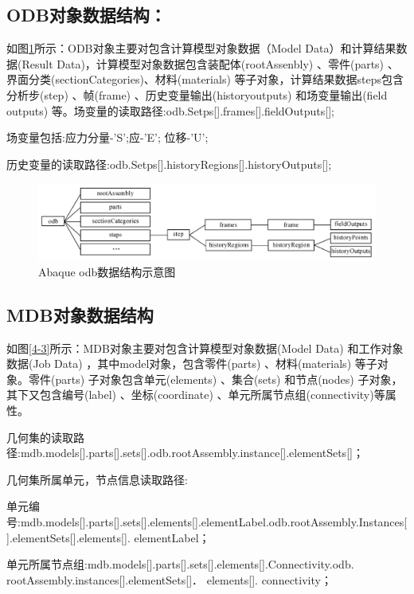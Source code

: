 \documentclass[forprint]{WHUBachelor}
\begin{document}
\subsection{ODB对象数据结构：}

如图\ref{4-2}所示：ODB对象主要对包含计算模型对象数据（Model Data）和计算结果数据(Result Data)，计算模型对象数据包含装配体(rootAssenbly)
、零件(parts) 、界面分类(sectionCategories)、材料(materials) 等子对象，计算结果数据steps包含分析步(step)
、帧(frame) 、历史变量输出(historyoutputs) 和场变量输出(field outputs) 等。场变量的读取路径:odb.Setps{[}{]}.frames{[}{]}.fieldOutputs{[}{]};

场变量包括:应力分量-'S';应-'E'; 位移-'U';

历史变量的读取路径:odb.Setps{[}{]}.historyRegions{[}{]}.historyOutputs{[}{]};

\begin{figure}[H]
\centering  
\includegraphics[width = .8\textwidth]{2.png} 
\caption{Abaque odb数据结构示意图} 
\label{4-2} 
\end{figure}

\subsection{MDB对象数据结构}

如图\ref{4-3}所示：MDB对象主要对包含计算模型对象数据(Model Data) 和工作对象数据(Job Data) ，其中model对象，包含零件(parts)
、材料(materials) 等子对象。零件(parts) 子对象包含单元(elements) 、集合(sets) 和节点(nodes)
子对象，其下又包含编号(label) 、坐标(coordinate) 、单元所属节点组(connectivity)等属性。

几何集的读取路径:mdb.models{[}{]}.parts{[}{]}.sets{[}{]}.odb.rootAssembly.instance{[}{]}.elementSets{[}{]}；

几何集所属单元，节点信息读取路径:

单元编号:mdb.models{[}{]}.parts{[}{]}.sets{[}{]}.elements{[}{]}.elementLabel.odb.rootAssembly.Instances{[}{]}.elementSets{[}{]}.elements{[}{]}.
elementLabel；

单元所属节点组:mdb.models{[}{]}.parts{[}{]}.sets{[}{]}.elements{[}{]}.Connectivity.odb.
rootAssembly.instances{[}{]}.elementSets{[}{]}． elements{[}{]}. connectivity；
\end{document}
